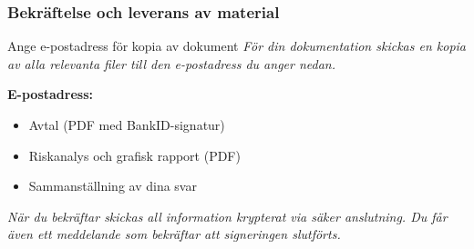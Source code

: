 \documentclass[10pt]{beamer}
\begin{document}
\begin{frame}[fragile]
  \frametitle{Bekräftelse och leverans av material}

  \begin{block}{Ange e-postadress för kopia av dokument}
    \vspace{0.2cm}
    \textit{För din dokumentation skickas en kopia av alla relevanta filer till den e-postadress du anger nedan.}
    \vspace{0.4cm}

    \textbf{E-postadress:} \underline{\hspace{6cm}}
    \vspace{0.5cm}

    \begin{itemize}
      \item Avtal (PDF med BankID-signatur)
      \item Riskanalys och grafisk rapport (PDF)
      \item Sammanställning av dina svar
    \end{itemize}
  \end{block}

  \vspace{0.5cm}
  \begin{center}
  \end{center}

  \vspace{0.6cm}
  \small
  \textit{När du bekräftar skickas all information krypterat via säker anslutning.  
  Du får även ett meddelande som bekräftar att signeringen slutförts.}

\end{frame}

\end{document}
